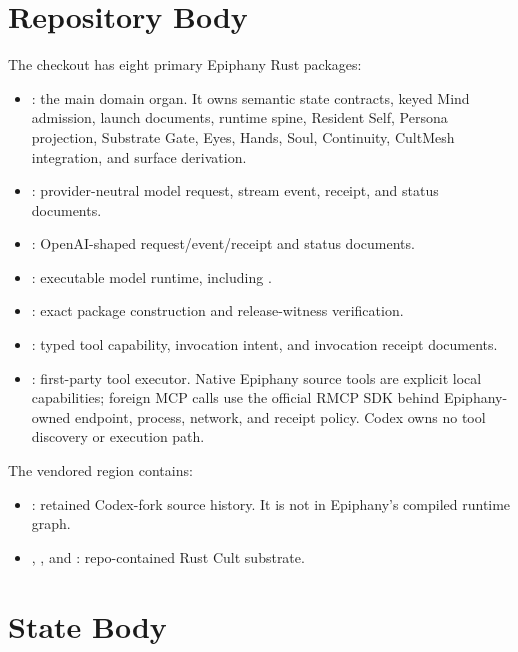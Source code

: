 \documentclass[11pt]{article}
\begin{document}
\section{Repository Body}

The checkout has eight primary Epiphany Rust packages:

\begin{itemize}
  \item {}: the main domain organ. It owns semantic state
  contracts, keyed Mind admission, launch documents, runtime spine, Resident
  Self, Persona projection, Substrate Gate, Eyes, Hands, Soul, Continuity,
  CultMesh integration, and surface derivation.
  \item {}: provider-neutral model request, stream
  event, receipt, and status documents.
  \item {}: OpenAI-shaped request/event/receipt and
  status documents.
  \item {}: executable model runtime, including
  .
  \item {}: exact package construction and
  release-witness verification.
  \item {}: typed tool capability, invocation intent,
  and invocation receipt documents.
  \item {}: first-party tool executor. Native
  Epiphany source tools are explicit local capabilities; foreign MCP calls use
  the official RMCP SDK behind Epiphany-owned endpoint, process, network, and
  receipt policy. Codex owns no tool discovery or execution path.
\end{itemize}

The vendored region contains:

\begin{itemize}
  \item {}: retained Codex-fork source history. It is not in
  Epiphany's compiled runtime graph.
  \item {}, , and
  : repo-contained Rust Cult substrate.
\end{itemize}

\section{State Body}
\end{document}
